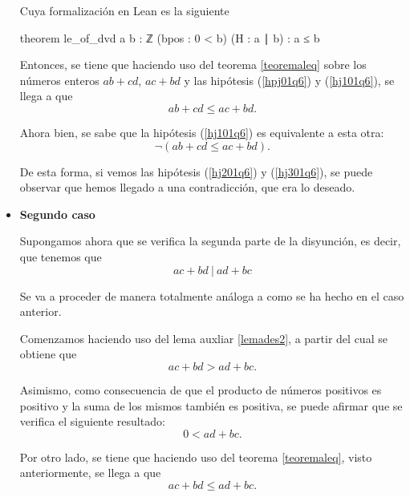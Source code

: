 \begin{demostracion}
\begin{itemize}
    Cuya formalización en Lean es la siguiente
    \begin{leancode}
    theorem le_of_dvd {a b : ℤ}
    (bpos : 0 < b)
    (H : a ∣ b) :
    a ≤ b 
    \end{leancode}

    Entonces, se tiene que haciendo uso del teorema \ref{teoremaleq} sobre
    los números enteros \(ab+cd\), \(ac+bd\) y las hipótesis (\ref{hpj01q6})
    y (\ref{hj101q6}), se llega a que
    \begin{equation}\tag{hj2}\label{hj201q6}
      ab+cd≤ac+bd.
    \end{equation}

    Ahora bien, se sabe que la hipótesis (\ref{hj101q6}) es equivalente a
    esta otra:
    \begin{equation}\tag{hj3}\label{hj301q6}
      ¬(ab+cd≤ac+bd).
    \end{equation}

    De esta forma, si vemos las hipótesis (\ref{hj201q6}) y (\ref{hj301q6}),
    se puede observar que hemos llegado a una contradicción, que era lo
    deseado.

  \item \textbf{Segundo caso}
    
    Supongamos ahora que se verifica la segunda parte de la disyunción, es
    decir, que tenemos que
    \begin{equation}\tag{hk}\label{hk01q6teor}
      ac+bd\ |\ ad+bc
    \end{equation}

    Se va a proceder de manera totalmente análoga a como se ha hecho en el
    caso anterior.

    Comenzamos haciendo uso del lema auxliar \ref{lemades2}, a partir del
    cual se obtiene que
     \begin{equation}\tag{hk1}\label{hk101q6}
      ac+bd > ad+bc.
    \end{equation}

    Asimismo, como consecuencia de que el producto de números positivos
    es positivo y la suma de los mismos también es positiva, se puede
    afirmar que se verifica el siguiente resultado:
    \begin{equation}
      0<ad+bc.
    \end{equation}

    Por otro lado, se tiene que haciendo uso del teorema \ref{teoremaleq},
    visto anteriormente, se llega a que
    \begin{equation}\tag{hk2}\label{hk201q6}
      ac+bd≤ad+bc.
    \end{equation}


\end{itemize}
\end{demostracion}
